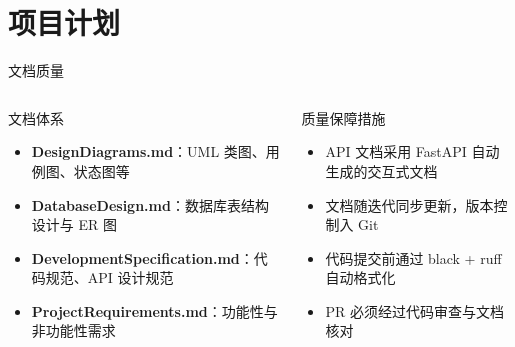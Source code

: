 \documentclass[aspectratio=169,UTF8]{ctexbeamer}
\begin{document}
\section{项目计划}

\begin{frame}{文档质量}
    \begin{columns}
        \begin{block}{文档体系}
            \begin{itemize}
                \item \textbf{DesignDiagrams.md}：UML 类图、用例图、状态图等
                \item \textbf{DatabaseDesign.md}：数据库表结构设计与 ER 图
                \item \textbf{DevelopmentSpecification.md}：代码规范、API 设计规范
                \item \textbf{ProjectRequirements.md}：功能性与非功能性需求
            \end{itemize}
        \end{block}
        \begin{block}{质量保障措施}
            \begin{itemize}
                \item API 文档采用 FastAPI 自动生成的交互式文档
                \item 文档随迭代同步更新，版本控制入 Git
                \item 代码提交前通过 black + ruff 自动格式化
                \item PR 必须经过代码审查与文档核对
            \end{itemize}
        \end{block}
    \end{columns}
\end{frame}
\end{document}
